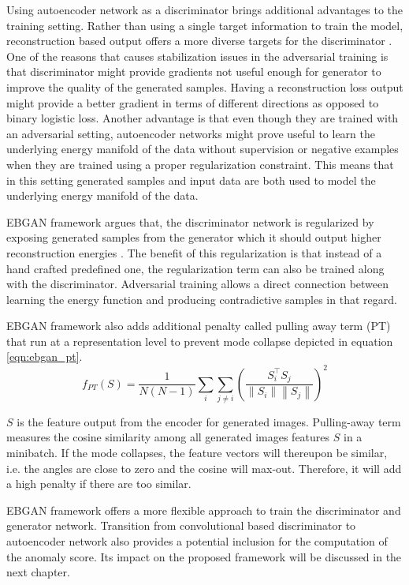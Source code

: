 Using autoencoder network as a discriminator brings additional advantages to the training setting.
Rather than using a single target information to train the model, reconstruction based output offers
a more diverse targets for the discriminator \cite{Zhao2016EnergybasedGA}. One of the reasons that causes
stabilization issues in the adversarial training is that discriminator might provide gradients not
useful enough for generator to improve the quality of the generated samples. Having a reconstruction
loss output might provide a better gradient in terms of different directions as opposed to binary
logistic loss\cite{Zhao2016EnergybasedGA}. Another advantage is that even though they are trained with an adversarial setting,
autoencoder networks might prove useful to learn the underlying energy manifold of the data without
supervision or negative examples when they are trained using a proper regularization constraint.
This means that in this setting generated samples and input data are both used to model the
underlying energy manifold of the data. 

EBGAN framework argues that, the discriminator network is regularized by exposing generated samples
from the generator  which it should output higher reconstruction energies
\cite{Zhao2016EnergybasedGA}. The benefit of this regularization is that instead of a hand crafted
predefined one, the regularization term can also be trained along with the discriminator.
Adversarial training allows a direct connection between learning the energy function and producing
contradictive samples in that regard. 

EBGAN framework also adds additional penalty called pulling away term (PT) that run at a
representation level to prevent mode collapse depicted in equation \ref{eqn:ebgan_pt}.
\begin{equation}
\label{eqn:ebgan_pt}
	f_{P T}(S)=\frac{1}{N(N-1)} \sum_{i} \sum_{j \neq i}\left(\frac{S_{i}^{\top} S_{j}}{\left\|S_{i}\right\|\left\|S_{j}\right\|}\right)^{2}
\end{equation}

 $S$ is the feature output from the encoder for generated images. Pulling-away term measures the
 cosine similarity among all generated images features $S$ in a minibatch. If the mode collapses,
 the feature vectors will thereupon be similar, i.e. the angles are close to zero and the cosine
 will max-out. Therefore, it will add a high penalty if there are too similar.
 \cite{Zhao2016EnergybasedGA}
 
 EBGAN framework offers a more flexible approach to train the discriminator and generator network. 
 Transition from convolutional based discriminator to autoencoder network also provides a potential inclusion 
 for the computation of the anomaly score. Its impact on the proposed framework will be discussed in the next chapter. 

\endgroup
